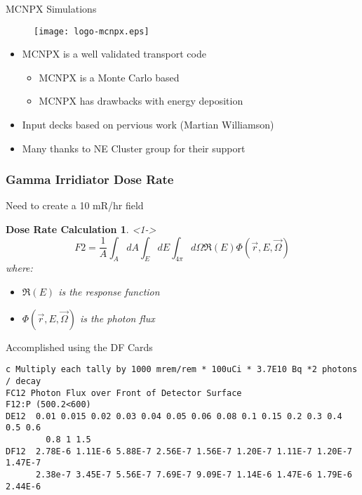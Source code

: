 \begin{frame}{MCNPX Simulations}
	\centering
	\begin{figure}
		\texttt{[image: logo-mcnpx.eps]}
	\end{figure}
\begin{itemize}
    \item MCNPX is a well validated transport code \cite{pelowitz_mcnpx_2010}
    \begin{itemize}
        \item MCNPX is a Monte Carlo based
        \item MCNPX has drawbacks with energy deposition
    \end{itemize}
    \item Input decks based on pervious work (Martian Williamson)
    \item Many thanks to NE Cluster group for their support
\end{itemize}
\hyperlink{MCNPXMain}{}
\hyperlink{toc}{}
\end{frame}
\begin{frame}[fragile]
\frametitle{Gamma Irridiator Dose Rate}
	\tiny
	Need to create a 10 mR/hr field
	\newtheorem{MCNPXModelTHM10}{Dose Rate Calculation}
	\begin{MCNPXModelTHM10}<1->
		$$F2 = \frac{1}{A} \int_{A}{dA}\int_{E}{dE}\int_{4\pi}{d \Omega \Re(E) \Phi(\vec{r},E,\vec{\Omega})} $$
	where:
	\begin{itemize}
		\item $\Re(E)$ is the response function
		\item $\Phi(\vec{r},E,\vec{\Omega})$ is the photon flux
	\end{itemize}
	\end{MCNPXModelTHM10}
Accomplished using the DF Cards
\begin{lstlisting}
c Multiply each tally by 1000 mrem/rem * 100uCi * 3.7E10 Bq *2 photons / decay
FC12 Photon Flux over Front of Detector Surface
F12:P (500.2<600)
DE12  0.01 0.015 0.02 0.03 0.04 0.05 0.06 0.08 0.1 0.15 0.2 0.3 0.4 0.5 0.6  
		0.8 1 1.5
DF12  2.78E-6 1.11E-6 5.88E-7 2.56E-7 1.56E-7 1.20E-7 1.11E-7 1.20E-7 1.47E-7
      2.38e-7 3.45E-7 5.56E-7 7.69E-7 9.09E-7 1.14E-6 1.47E-6 1.79E-6 2.44E-6
\end{lstlisting}
\hyperlink{MCNPXMain}{}
\hyperlink{toc}{}
\end{frame}

